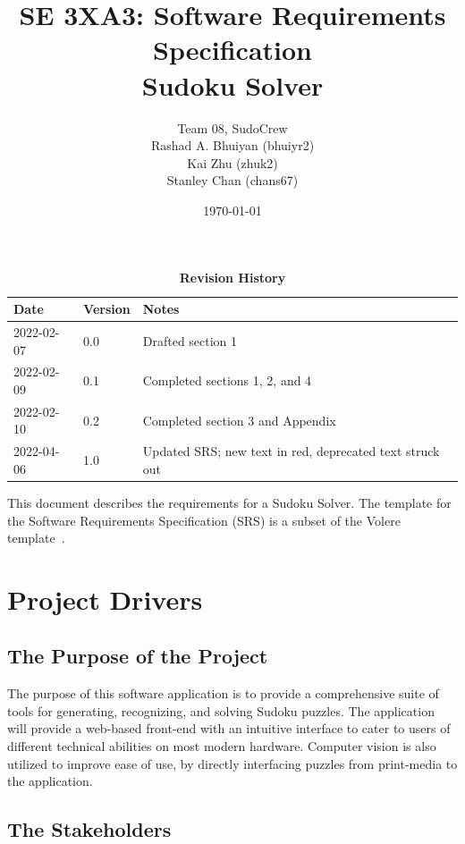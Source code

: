 \documentclass[11pt]{article}
\title{SE 3XA3: Software Requirements Specification\\Sudoku Solver}
\author{Team 08, SudoCrew
		\\ Rashad A. Bhuiyan (bhuiyr2)
		\\ Kai Zhu (zhuk2)
		\\ Stanley Chan (chans67)
}
\date{\today}
\begin{document}
\maketitle

\tableofcontents
\newpage
\listoftables
\listoffigures

\newpage

\begin{table}[H]
\caption{\bf Revision History}
\begin{tabularx}{\textwidth}{p{3cm}p{2cm}X}
\toprule {\bf Date} & {\bf Version} & {\bf Notes}\\
\midrule
2022-02-07 & 0.0 & Drafted section 1\\
2022-02-09 & 0.1 & Completed sections 1, 2, and 4\\
2022-02-10 & 0.2 & Completed section 3 and Appendix\\
2022-04-06 & 1.0 & Updated SRS; new text in red, deprecated text struck out\\
\bottomrule
\end{tabularx}
\end{table}

\newpage


This document describes the requirements for a Sudoku Solver.  The template for the Software
Requirements Specification (SRS) is a subset of the Volere
template~\citep{RobertsonAndRobertson2012}.

\section{Project Drivers}

\subsection{The Purpose of the Project}
The purpose of this software application is to provide a comprehensive suite of tools for generating, recognizing, and solving Sudoku puzzles. The application will provide a web-based front-end with an intuitive interface to cater to users of different technical abilities on most modern hardware. Computer vision is also utilized to improve ease of use, by directly interfacing puzzles from print-media to the application.

\subsection{The Stakeholders}
\end{document}

